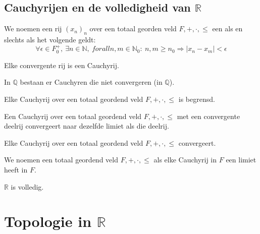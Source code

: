 \documentclass[main.tex]{subfiles}
\begin{document}
\subsection{Cauchyrijen en de volledigheid van $\mathbb{R}$}
\label{sec:cauchyrijen-en-de}

\begin{de}
  We noemen een rij $(x_{n})_{n}$ over een totaal georden veld $F,+,\cdot,\le$ een  als en slechts als het volgende geldt:
  \[ \forall \epsilon \in F_{0}^{+},\ \exists n\in \mathbb{N},\ forall n,m \in \mathbb{N}_{0}:\ n,m \ge n_{0} \Rightarrow |x_{n}-x_{m}| < \epsilon \]
\end{de}

\begin{pr}
  Elke convergente rij is een Cauchyrij.
\end{pr}

\begin{pr}
  In $\mathbb{Q}$ bestaan er Cauchyren die niet convergeren (in $\mathbb{Q}$).
\end{pr}

\begin{pr}
  Elke Cauchyrij over een totaal geordend veld $F,+,\cdot,\le$ is begrensd.
\end{pr} 

\begin{pr}
  Een Cauchyrij over een totaal geordend veld $F,+,\cdot,\le$ met een convergente deelrij convergeert naar dezelfde limiet als die deelrij.
\end{pr}

\begin{pr}
  Elke Cauchyrij over een totaal geordend veld $F,+,\cdot,\le$ convergeert.
\end{pr}

\begin{de}
  We noemen een totaal geordend veld $F,+,\cdot,\le$  als elke Cauchyrij in $F$ een limiet heeft in $F$.
\end{de}

\begin{st}
  $\mathbb{R}$ is volledig.
\end{st}


\section{Topologie in $\mathbb{R}$}
\label{sec:topologie-mathbbr}
\end{document}
